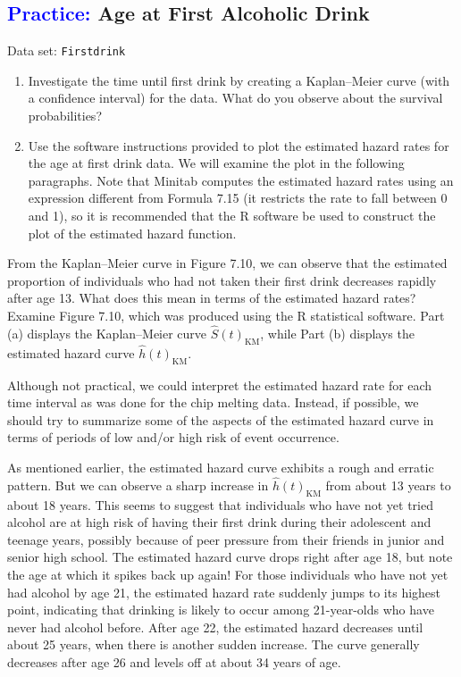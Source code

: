 \documentclass[
]{report}
\begin{document}
\hypertarget{age-at-first-alcoholic-drink-1}{%
\subsection*{\texorpdfstring{\textcolor{blue}{Practice:} Age at First Alcoholic Drink}{ Age at First Alcoholic Drink}}\label{age-at-first-alcoholic-drink-1}}

Data set: \texttt{Firstdrink}

\begin{enumerate}
\def\labelenumi{\arabic{enumi}.}
\setcounter{enumi}{42}
\item
  Investigate the time until first drink by creating a Kaplan--Meier curve (with a confidence interval) for the data. What do you observe about the survival probabilities?
\item
  Use the software instructions provided to plot the estimated hazard rates for the age at first drink data. We will examine the plot in the following paragraphs. Note that Minitab computes the estimated hazard rates using an expression different from Formula 7.15 (it restricts the rate to fall between 0 and 1), so it is recommended that the R software be used to construct the plot of the estimated hazard function.
\end{enumerate}

From the Kaplan--Meier curve in Figure 7.10, we can observe that the estimated proportion of individuals who had not taken their first drink decreases rapidly after age 13. What does this mean in terms of the estimated hazard rates? Examine Figure 7.10, which was produced using the R statistical software. Part (a) displays the Kaplan--Meier curve \(\scriptstyle \hat S(t)_{\mathrm{KM}}\), while Part (b) displays the estimated hazard curve \(\scriptstyle \hat h(t)_{\mathrm{KM}}\).

Although not practical, we could interpret the estimated hazard rate for each time interval as was done for
the chip melting data. Instead, if possible, we should try to summarize some of the aspects of the estimated
hazard curve in terms of periods of low and/or high risk of event occurrence.

As mentioned earlier, the estimated hazard curve exhibits a rough and erratic pattern. But we can observe
a sharp increase in \(\scriptstyle \hat h(t)_{\mathrm{KM}}\) from about 13 years to about 18 years. This seems to suggest that individuals who have not yet tried alcohol are at high risk of having their first drink during their adolescent and teenage years,
possibly because of peer pressure from their friends in junior and senior high school. The estimated hazard
curve drops right after age 18, but note the age at which it spikes back up again! For those individuals who
have not yet had alcohol by age 21, the estimated hazard rate suddenly jumps to its highest point, indicating
that drinking is likely to occur among 21-year-olds who have never had alcohol before. After age 22, the
estimated hazard decreases until about 25 years, when there is another sudden increase. The curve generally
decreases after age 26 and levels off at about 34 years of age.
\end{document}
